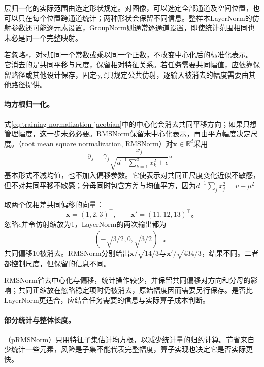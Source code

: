 层归一化的实际范围由选定形状规定。对图像，可以选定全部通道及空间位置，也可以只在每个位置跨通道统计；两种形状会保留不同信息。整样本LayerNorm的仿射参数还可能逐元素设置，GroupNorm则通常逐通道设置，即使统计范围相同也未必是同一个完整映射。

若忽略$\epsilon$，对$\bm x$加同一个常数或乘以同一个正数，不改变中心化后的标准化表示。它消去的是共同平移与尺度，保留相对特征关系。若任务需要共同幅值，应依靠保留路径或其他设计保存，固定$\gamma,\zeta$只规定公共仿射，逐输入被消去的幅度需要由其他路径提供。

\paragraph{均方根归一化。}

式\eqref{eq:training-normalization-jacobian}中的中心化会消去共同平移方向；如果只想管理幅度，这一步未必必要。RMSNorm保留未中心化表示，再由平方幅度决定尺度。（root mean square normalization, RMSNorm）对$\bm x\in\mathbb R^d$采用
\begin{equation}
  y_j=\gamma_j\frac{x_j}{\sqrt{d^{-1}\sum_{k=1}^d x_k^2+\epsilon}}\text{。}
  \label{eq:training-rmsnorm}
\end{equation}
基本形式不减均值，也不加入偏移参数。它使表示对共同正尺度变化近似不敏感，但不对共同平移不敏感；分母同时包含方差与均值平方，因为$d^{-1}\sum_jx_j^2=v+\mu^2$

\begin{example}[减去均值改变了哪些信息]
  \label{ex:training-layer-rms}
  取两个仅相差共同偏移的向量：
  \[
    \bm x=(1,2,3)^{\top},\qquad \bm x'=(11,12,13)^{\top}\text{。}
  \]
  忽略$\epsilon$并令仿射缩放为1，LayerNorm的两次输出都为
  \[
    (-\sqrt{3/2},0,\sqrt{3/2})^{\top}\text{。}
  \]
  共同偏移10被消去。RMSNorm分别给出$\bm x/\sqrt{14/3}$与$\bm x'/\sqrt{434/3}$，结果不同。二者都控制尺度，但保留的信息不同。
\end{example}

RMSNorm省去中心化与偏移，统计操作较少，并保留共同偏移对方向和分母的影响；共同正缩放在忽略稳定项时仍被消去，原始幅度因而需要另行保存。是否比LayerNorm更适合，应结合任务需要的信息与实际算子成本判断。

\paragraph{部分统计与整体长度。}

（pRMSNorm）只用特征子集估计均方根，以减少统计量的归约计算。节省来自少统计一些元素，风险是子集不能代表完整幅度，算子实现也决定它是否实际更快。

